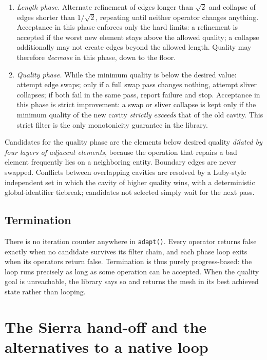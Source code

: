 \documentclass[11pt]{article}
\newcommand{\code}[1]{\texttt{#1}}
\begin{document}
\begin{enumerate}[itemsep=2pt]
\item \emph{Length phase.} Alternate refinement of edges longer than
  $\sqrt{2}$ and collapse of edges shorter than $1/\sqrt{2}$, repeating
  until neither operator changes anything. Acceptance in this phase
  enforces only the hard limits: a refinement is accepted if the worst new
  element stays above the allowed quality; a collapse additionally may
  not create edges beyond the allowed length. Quality may therefore
  \emph{decrease} in this phase, down to the floor.
\item \emph{Quality phase.} While the minimum quality is below the
  desired value: attempt edge swaps; only if a full swap pass changes
  nothing, attempt sliver collapses; if both fail in the same pass,
  report failure and stop. Acceptance in this phase is strict
  improvement: a swap or sliver collapse is kept only if the minimum
  quality of the new cavity \emph{strictly exceeds} that of the old
  cavity. This strict filter is the only monotonicity guarantee in the
  library.
\end{enumerate}

Candidates for the quality phase are the elements below desired quality
\emph{dilated by four layers of adjacent elements}, because the operation
that repairs a bad element frequently lies on a neighboring entity.
Boundary edges are never swapped. Conflicts between overlapping cavities
are resolved by a Luby-style independent set in which the cavity of
higher quality wins, with a deterministic global-identifier tiebreak;
candidates not selected simply wait for the next pass.

\subsection{Termination}

There is no iteration counter anywhere in \code{adapt()}. Every operator
returns false exactly when no candidate survives its filter chain, and
each phase loop exits when its operators return false. Termination is
thus purely progress-based: the loop runs precisely as long as some
operation can be accepted. When the quality goal is unreachable, the
library says so and returns the mesh in its best achieved state rather
than looping.

\section{The Sierra hand-off and the alternatives to a native loop}
\label{sec:alternatives}
\end{document}
